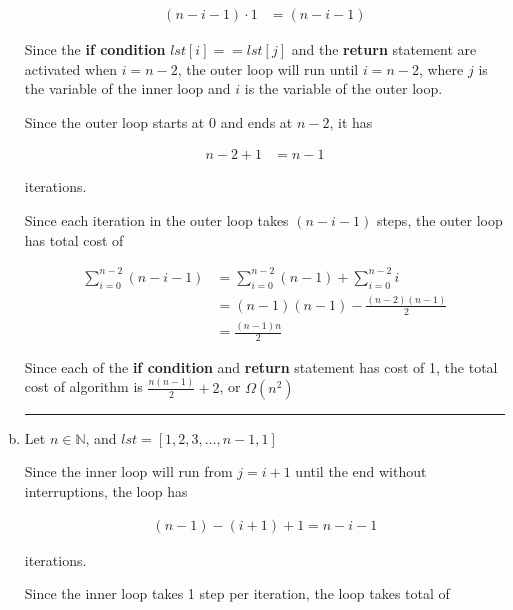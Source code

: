 \documentclass[12pt]{article}
\begin{document}
\begin{enumerate}[a.]
    \begin{align}
        (n-i-1) \cdot 1 &= (n-i-1)
    \end{align}

    \bigskip

    Since the \textbf{if condition} $lst[i] == lst[j]$ and the \textbf{return}
    statement are activated when $i=n-2$, the outer loop will run until $i=n-2$,
    where $j$ is the variable of the inner loop and $i$ is the variable of
    the outer loop.

    \bigskip

    Since the outer loop starts at 0 and ends at $n-2$, it has

    \begin{align}
        n-2+1 &= n-1
    \end{align}

    iterations.

    \bigskip

    Since each iteration in the outer loop takes $(n-i-1)$ steps, the outer
    loop has total cost of

    \begin{align}
        \sum\limits_{i=0}^{n-2} (n-i-1) &= \sum\limits_{i=0}^{n-2} (n-1) + \sum\limits_{i=0}^{n-2} i\\
        &= (n-1)(n-1) - \frac{(n-2)(n-1)}{2}\\
        &= \frac{(n-1)n}{2}
    \end{align}

    Since each of the \textbf{if condition} and \textbf{return} statement has cost of 1,
    the total cost of algorithm is $\frac{n(n-1)}{2} + 2$, or $\Omega(n^2)$

    \noindent\rule{\textwidth}{1pt}

    \item

    Let $n \in \mathbb{N}$, and $lst = [1,2,3,\dots,n-1,1]$

    \bigskip

    Since the inner loop will run from $j = i + 1$ until the end without interruptions,
    the loop has

    \setcounter{equation}{0}
    \begin{align}
        (n-1)-(i+1)+1 = n-i-1
    \end{align}

    iterations.

    \bigskip

    Since the inner loop takes 1 step per iteration, the loop takes total of


\end{enumerate}
\end{document}
